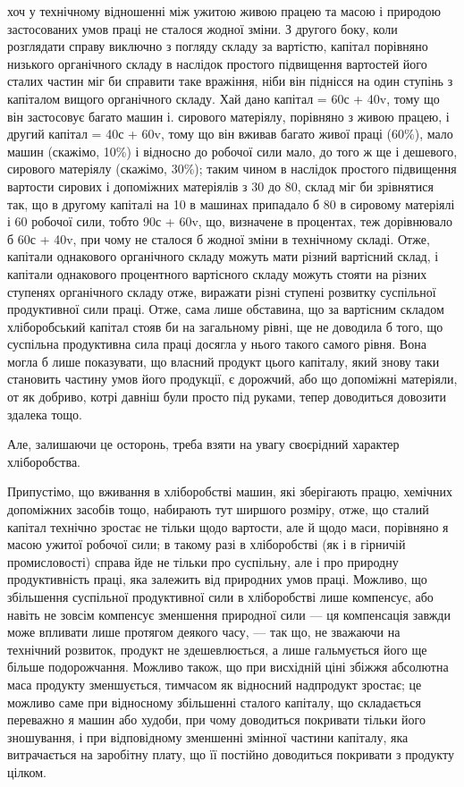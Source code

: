 \parcont{}  %
хоч у технічному відношенні між ужитою живою працею та масою і природою
застосованих умов праці не сталося жодної зміни. З другого боку, коли розглядати
справу виключно з погляду складу за вартістю, капітал порівняно низького
органічного складу в наслідок простого підвищення вартостей його сталих частин
міг би справити таке вражіння, ніби він піднісся на один ступінь з капіталом
вищого органічного складу. Хай дано капітал = 60с + 40v, тому що він
застосовує багато машин і. сирового матеріялу, порівняно з живою працею, і
другий капітал = 40с + 60v, тому що він вживав багато живої праці (60\%),
мало машин (скажімо, 10\%) і відносно до робочої сили мало, до того ж
ще і дешевого, сирового матеріялу (скажімо, 30\%); таким чином в наслідок простого
підвищення вартости сирових і допоміжних матеріялів з 30 до 80, склад
міг би зрівнятися так, що в другому капіталі на 10 в машинах припадало б 80
в сировому матеріялі і 60 робочої сили, тобто 90с + 60v, що, визначене в процентах,
теж дорівнювало б 60с + 40v, при чому не сталося б жодної зміни в технічному
складі. Отже, капітали однакового органічного складу можуть мати
різний вартісний склад, і капітали однакового процентного вартісного складу
можуть стояти на різних ступенях органічного складу отже, виражати різні ступені
розвитку суспільної продуктивної сили праці. Отже, сама лише обставина,
що за вартісним складом хліборобський капітал стояв би на загальному рівні, ще
не доводила б того, що суспільна продуктивна сила праці досягла у нього
такого самого рівня. Вона могла б лише показувати, що власний продукт цього
капіталу, який знову таки становить частину умов його продукції, є дорожчий,
або що допоміжні матеріяли, от як добриво, котрі давніш були просто під руками,
тепер доводиться довозити здалека тощо.

Але, залишаючи це осторонь, треба взяти на увагу своєрідний характер
хліборобства.

Припустімо, що вживання в хліборобстві машин, які зберігають працю,
хемічних допоміжних засобів тощо, набирають тут ширшого розміру, отже, що сталий
капітал технічно зростає не тільки щодо вартости, але й щодо маси, порівняно
я масою ужитої робочої сили; в такому разі в хліборобстві (як і в гірничій
промисловості) справа йде не тільки про суспільну, але і про природну продуктивність
праці, яка залежить від природних умов праці. Можливо, що збільшення
суспільної продуктивної сили в хліборобстві лише компенсує, або навіть
не зовсім компенсує зменшення природної сили — ця компенсація завжди може
впливати лише протягом деякого часу, — так що, не зважаючи на технічний
розвиток, продукт не здешевлюється, а лише гальмується його ще більше подорожчання.
Можливо також, що при висхідній ціні збіжжя абсолютна маса
продукту зменшується, тимчасом як відносний надпродукт зростає; це можливо
саме при відносному збільшенні сталого капіталу, що складається переважно
я машин або худоби, при чому доводиться покривати тільки його зношування,
і при відповідному зменшенні змінної частини капіталу, яка витрачається на
заробітну плату, що її постійно доводиться покривати з продукту цілком.

